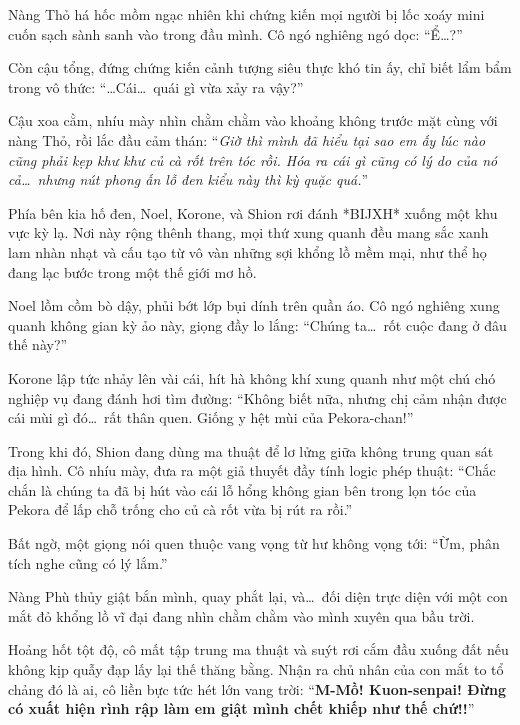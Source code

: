 \documentclass[../main.tex]{subfiles}
\begin{document}
Nàng Thỏ há hốc mồm ngạc nhiên khi chứng kiến mọi người bị lốc xoáy mini cuốn sạch sành sanh vào trong đầu mình. Cô ngó nghiêng ngó dọc: ``Ể\dots?''

Còn cậu tổng, đứng chứng kiến cảnh tượng siêu thực khó tin ấy, chỉ biết lẩm bẩm trong vô thức: ``\dots Cái\dots\ quái gì vừa xảy ra vậy?''

Cậu xoa cằm, nhíu mày nhìn chằm chằm vào khoảng không trước mặt cùng với nàng Thỏ, rồi lắc đầu cảm thán: ``\textit{Giờ thì mình đã hiểu tại sao em ấy lúc nào cũng phải kẹp khư khư củ cà rốt trên tóc rồi. Hóa ra cái gì cũng có lý do của nó cả\dots\ nhưng nút phong ấn lỗ đen kiểu này thì kỳ quặc quá.}''

\ct

Phía bên kia hố đen, Noel, Korone, và Shion rơi đánh *BIJXH* xuống một khu vực kỳ lạ. Nơi này rộng thênh thang, mọi thứ xung quanh đều mang sắc xanh lam nhàn nhạt và cấu tạo từ vô vàn những sợi khổng lồ mềm mại, như thể họ đang lạc bước trong một thế giới mơ hồ.


Noel lồm cồm bò dậy, phủi bớt lớp bụi dính trên quần áo. Cô ngó nghiêng xung quanh không gian kỳ ảo này, giọng đầy lo lắng: ``Chúng ta\dots\ rốt cuộc đang ở đâu thế này?''

Korone lập tức nhảy lên vài cái, hít hà không khí xung quanh như một chú chó nghiệp vụ đang đánh hơi tìm đường: ``Không biết nữa, nhưng chị cảm nhận được cái mùi gì đó\dots\ rất thân quen. Giống y hệt mùi của Pekora-chan!''

Trong khi đó, Shion đang dùng ma thuật để lơ lửng giữa không trung quan sát địa hình. Cô nhíu mày, đưa ra một giả thuyết đầy tính logic phép thuật: ``Chắc chắn là chúng ta đã bị hút vào cái lỗ hổng không gian bên trong lọn tóc của Pekora để lấp chỗ trống cho củ cà rốt vừa bị rút ra rồi.''

Bất ngờ, một giọng nói quen thuộc vang vọng từ hư không vọng tới: ``Ừm, phân tích nghe cũng có lý lắm.''

Nàng Phù thủy giật bắn mình, quay phắt lại, và\dots\ đối diện trực diện với một con mắt đỏ khổng lồ vĩ đại đang nhìn chằm chằm vào mình xuyên qua bầu trời.

Hoảng hốt tột độ, cô mất tập trung ma thuật và suýt rơi cắm đầu xuống đất nếu không kịp quẫy đạp lấy lại thế thăng bằng. Nhận ra chủ nhân của con mắt to tổ chảng đó là ai, cô liền bực tức hét lớn vang trời: ``\textbf{M-Mồ! Kuon-senpai! Đừng có xuất hiện rình rập làm em giật mình chết khiếp như thế chứ!!}''
\end{document}

